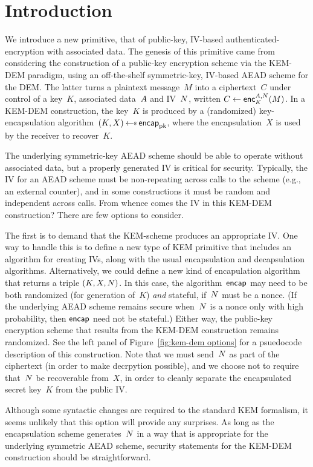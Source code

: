 \section{Introduction}
\label{sec:intro}
We introduce a new primitive, that of public-key, IV-based authenticated-encryption with associated data. The genesis of this primitive came from considering the construction of a public-key encryption scheme via the KEM-DEM paradigm, using an off-the-shelf symmetric-key, IV-based AEAD scheme for the DEM.  The latter turns a plaintext message~$M$ into a ciphertext~$C$ under control of a key~$K$, associated data~$A$ and IV~$N$, written $C \gets {\mathsf{enc}}_{K}^{A,N}(M)$.  In a KEM-DEM construction, the key~$K$ is produced by a (randomized) key-encapsulation algorithm~$(K,X)\getsr\encap_\pk$, where the encapsulation~$X$ is used by the receiver to recover~$K$.  

The underlying symmetric-key AEAD scheme should be able to operate without associated data, but a properly generated IV is critical for security.  Typically, the IV for an AEAD scheme must be non-repeating across calls to the scheme (e.g., an external counter), and in some constructions it must be random and independent across calls. From whence comes the IV in this KEM-DEM construction?  There are few options to consider.  

The first is to demand that the KEM-scheme produces an appropriate IV.  One way to handle this is to define a new type of KEM primitive that includes an algorithm for creating IVs, along with the usual encapsulation and decapsulation algorithms.  Alternatively, we could define a new kind of encapulation algorithm that returns a triple $(K,X,N)$.  In this case, the algorithm~$\mathsf{encap}$ may need to be both randomized (for generation of~$K$) \emph{and} stateful, if~$N$ must be a nonce.  (If the underlying AEAD scheme remains secure when~$N$ is a nonce only with high probability, then $\mathsf{encap}$ need not be stateful.)  Either way, the public-key encryption scheme that results from the KEM-DEM construction remains randomized.  See the left panel of Figure~\ref{fig:kem-dem options} for a psuedocode description of this construction.  Note that we must send~$N$ as part of the ciphertext (in order to make decrpytion possible), and we choose not to require that~$N$ be recoverable from~$X$, in order to cleanly separate the encapsulated secret key~$K$ from the public IV.

Although some syntactic changes are required to the standard KEM formalism, it seems unlikely that this option will provide any surprises.  As long as the encapsulation scheme generates~$N$ in a way that is appropriate for the underlying symmetric AEAD scheme, security statements for the KEM-DEM construction should be straightforward.

